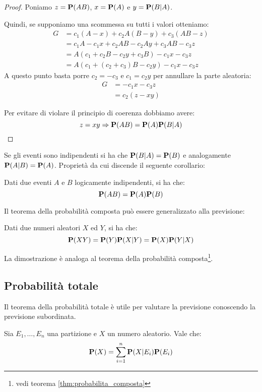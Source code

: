 \begin{proof}
  Poniamo \( z = \mathbf{P}(AB) \), \( x = \mathbf{P}(A) \) e \( y = \mathbf{P}(B|A) \).

  Quindi, se supponiamo una scommessa su tutti i valori otteniamo:
  \begin{align*}
    G &= c_1 (A - x) + c_2 A (B - y) + c_3 (AB - z) \\
    &= c_1A - c_1 x + c_2 AB - c_2 Ay + c_3 AB - c_3 z \\
    &= A(c_1 + c_2 B - c_2 y + c_3 B) - c_1 x - c_3 z \\
    &= A(c_1 + (c_2 + c_3)B - c_2 y) - c_1 x - c_3 z
  \end{align*}
  A questo punto basta porre \( c_2 = - c_3 \) e \( c_1 = c_2 y \) per annullare la parte aleatoria:
  \begin{align*}
    G &= - c_1 x - c_3 z \\
    &= c_2 (z - xy)
  \end{align*}

  Per evitare di violare il principio di coerenza dobbiamo avere:
  \[ z = xy \Rightarrow \mathbf{P}(AB) = \mathbf{P}(A) \mathbf{P}(B|A) \]
\end{proof}

Se gli eventi sono indipendenti si ha che \( \mathbf{P}(B|A) = \mathbf{P}(B) \) e analogamente \( \mathbf{P}(A|B) = \mathbf{P}(A) \). Proprietà da cui discende il seguente corollario:
\begin{corollary}
  Dati due eventi $A$ e $B$ logicamente indipendenti, si ha che:
  \[ \mathbf{P}(AB) = \mathbf{P}(A)\mathbf{P}(B) \]
\end{corollary}

Il teorema della probabilità composta può essere generalizzato alla previsione:
\begin{corollary}
  Dati due numeri aleatori $X$ ed $Y$, si ha che:
  \[ \mathbf{P}(XY) = \mathbf{P}(Y)\mathbf{P}(X|Y) = \mathbf{P}(X)\mathbf{P}(Y|X) \] %
\end{corollary}
La dimostrazione è analoga al teorema della probabilità composta\footnote{vedi teorema \ref{thm:probabilita_composta}}.

\subsection{Probabilità totale}
Il teorema della probabilità totale è utile per valutare la previsione conoscendo la previsione subordinata.

\begin{theorem}\label{thm:probabilita_totale}
  Sia \( E_1, \ldots, E_n \) una partizione e $X$ un numero aleatorio. Vale che:
  \[ \mathbf{P}(X) = \sum_{i = 1}^{n} \mathbf{P}(X|E_i)\mathbf{P}(E_i) \]
\end{theorem}

